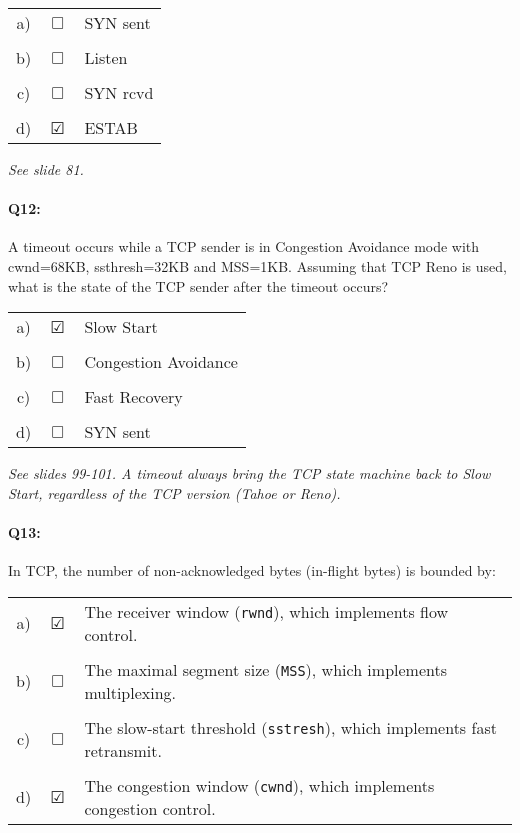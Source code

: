 \documentclass{llncs}
\newcommand{\answer}[1]{{\color{red}\textit{#1}\color{black}}}
\begin{document}
\begin{tabular}{ccl}
  a) & $\Box$ &  SYN sent\\
  \\
  b) & $\Box$ &  Listen\\
  \\
  c) & $\Box$ & SYN rcvd\\
  \\
  d) & $\CheckedBox$ & ESTAB \\
\end{tabular}

\answer{See slide 81.}

\paragraph{\textbf{Q12:}}
A timeout occurs while a TCP sender is in Congestion Avoidance mode with cwnd=68KB, ssthresh=32KB and MSS=1KB. Assuming that TCP Reno is used, what is the state of the TCP sender after the timeout occurs?

\begin{tabular}{ccl}
  a) & $\CheckedBox$ &  Slow Start\\
  \\
  b) & $\Box$ &  Congestion Avoidance\\
  \\
  c) & $\Box$ & Fast Recovery \\
  \\
  d) & $\Box$ & SYN sent \\
\end{tabular}

\answer{See slides 99-101. A timeout always bring the TCP state
  machine back to Slow Start, regardless of the TCP version (Tahoe or
  Reno).}

\paragraph{\textbf{Q13:}}

In TCP, the number of non-acknowledged bytes (in-flight bytes) is bounded by:

\begin{tabular}{ccl}
  a) & $\CheckedBox$ & The receiver window (\texttt{rwnd}), which implements flow control.\\
  \\
  b) & $\Box$ & The maximal segment size (\texttt{MSS}), which implements multiplexing.\\
  \\
  c) & $\Box$ & The slow-start threshold (\texttt{sstresh}), which implements fast retransmit.\\
  \\
  d) & $\CheckedBox$ & The congestion window (\texttt{cwnd}), which implements congestion control.\\
\end{tabular}
\end{document}
